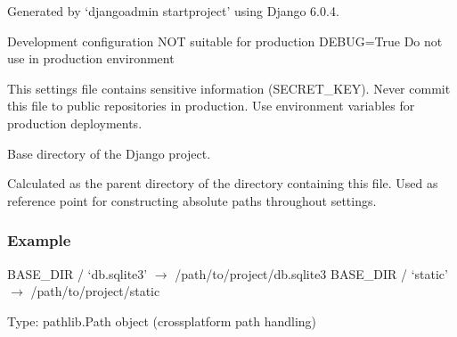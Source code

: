 \documentclass[letterpaper,10pt,english]{sphinxmanual}
\begin{document}
\sphinxAtStartPar
Generated by ‘django\sphinxhyphen{}admin startproject’ using Django 6.0.4.
\begin{description}
\sphinxAtStartPar
{}

\sphinxAtStartPar
{}

\sphinxAtStartPar
Development configuration \sphinxhyphen{} NOT suitable for production
DEBUG=True \sphinxhyphen{} Do not use in production environment

\sphinxAtStartPar
This settings file contains sensitive information (SECRET\_KEY).
Never commit this file to public repositories in production.
Use environment variables for production deployments.

\end{description}

\begin{fulllineitems}
\label{\detokenize{softwareProject:softwareProject.settings.BASE_DIR}}
\pysigstartsignatures
\pysigline
{}
\pysigstopsignatures
\sphinxAtStartPar
Base directory of the Django project.

\sphinxAtStartPar
Calculated as the parent directory of the directory containing this file.
Used as reference point for constructing absolute paths throughout settings.
\subsubsection*{Example}

\sphinxAtStartPar
BASE\_DIR / ‘db.sqlite3’ \(\rightarrow\) /path/to/project/db.sqlite3
BASE\_DIR / ‘static’ \(\rightarrow\) /path/to/project/static

\sphinxAtStartPar
Type: pathlib.Path object (cross\sphinxhyphen{}platform path handling)

\end{fulllineitems}
\end{document}
